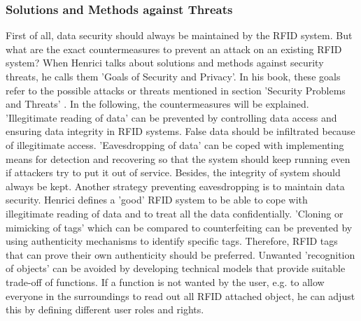 \subsubsection{Solutions and Methods against Threats} \label{solution}

First of all, data security should always be maintained by the RFID system. But what are the exact countermeasures to prevent an attack on an existing RFID system? When Henrici \cite[p.64 ff.]{henrici} talks about solutions and methods against security threats, he calls them 'Goals of Security and Privacy'. In his book, these goals refer to the possible attacks or threats mentioned in section 'Security Problems and Threats' \pageref{problems}. In the following, the countermeasures will be explained. 
'Illegitimate reading of data' can be prevented by controlling data access and ensuring data integrity in RFID systems. False data should be infiltrated because of illegitimate access.
'Eavesdropping of data' can be coped with implementing means for detection and recovering so that the system should keep running even if attackers try to put it out of service. Besides, the integrity of system should always be kept. Another strategy preventing eavesdropping is to maintain data security. Henrici defines a 'good' RFID system to be able to cope with illegitimate reading of data and to treat all the data confidentially.
'Cloning or mimicking of tags' which can be compared to counterfeiting can be prevented by using authenticity mechanisms to identify specific tags. Therefore, RFID tags that can prove their own authenticity should be preferred.
Unwanted 'recognition of objects' can be avoided by developing technical models that provide suitable trade-off of functions. If a function is not wanted by the user, e.g. to allow everyone in the surroundings to read out all RFID attached object, he can adjust this by defining different user roles and rights.

